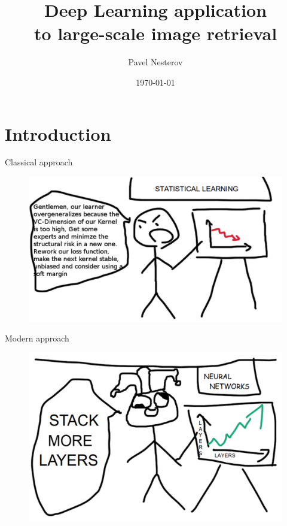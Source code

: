 \documentclass{beamer}
\title{Deep Learning application \\ to large-scale image retrieval }
\author{Pavel Nesterov}
\institute{\url{http://pavelnesterov.info/}}
\date{\today}
\let\otp\titlepage
\renewcommand{\titlepage}{\otp\addtocounter{framenumber}{-1}}
\begin{document}
\begin{frame}[plain]
  \titlepage
\end{frame}



\section{Introduction}


\begin{frame}{Classical approach}

\begin{figure}[h!]
  \centering
  \includegraphics[width=1\textwidth]{images/stat.png}
\end{figure}

\end{frame}


\begin{frame}{Modern approach}

\begin{figure}[h!]
  \centering
  \includegraphics[width=1\textwidth]{images/nn.png}
\end{figure}

\end{frame}
\end{document}
